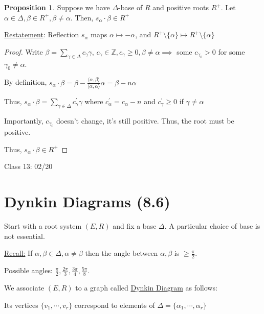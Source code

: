 \documentclass{article}
\theoremstyle{definition}
\newtheorem{proposition}{Proposition}
\begin{document}
\begin{proposition}
    Suppose we have \(\Delta\)-base of \(R\) and positive roots \(R^+\). Let \(\alpha \in \Delta , \beta \in R^+, \beta \neq \alpha \). Then, \(s_\alpha \cdot \beta \in R^+\) 
\end{proposition}

\underline{Restatement}: Reflection \(s_\alpha\) maps \(\alpha \mapsto -\alpha\), and \(R^+ \setminus \{ \alpha  \} \mapsto R^+ \setminus \{ \alpha \} \) 

\begin{proof}
    Write \(\beta = \sum_{\gamma \in \Delta}^{} c_\gamma \gamma \), \(c_\gamma \in \mathbb{Z} , c_\gamma \geq 0, \beta \neq \alpha \implies\) some \(c_{\gamma_0}> 0\) for some \(\gamma_0 \neq \alpha \).

    By definition, \(s_\alpha \cdot \beta = \beta - \frac{\langle \alpha ,\beta  \rangle }{\langle \alpha ,\alpha  \rangle }\alpha = \beta - n \alpha\)

    Thus, \(s_\alpha \cdot \beta = \sum_{\gamma \in \Delta }^{} c_\gamma^{\prime} \gamma\) where \(c_\alpha ^{\prime} = c_\alpha - n\) and \(c_\gamma ^{\prime} \geq 0\) if \(\gamma \neq \alpha\) 

    Importantly, \(c_{\gamma_0}\) doesn't change, it's still positive. Thus, the root must be positive.

    Thus, \(s_\alpha \cdot \beta \in R^+\) 
\end{proof}

\hrulefill

Class 13: 02/20

\section*{Dynkin Diagrams (8.6)}

Start with a root system \((E,R)\) and fix a base \(\Delta \). A particular choice of base is not essential.

\underline{Recall:} If \(\alpha ,\beta \in \Delta , \alpha \neq \beta \) then the angle between \(\alpha ,\beta \) is \(\geq \frac{\pi}{2}\).

Possible angles: \(\frac{\pi}{2},\frac{2\pi}{3},\frac{3\pi}{4},\frac{5\pi}{8}\).

We associate \((E,R)\) to a graph called \underline{Dynkin Diagram} as follows:

Its vertices \(\{ v_1,\cdots,v_r \} \) correspond to elements of \(\Delta = \{ \alpha _1,\cdots,\alpha _r \} \)
\end{document}

